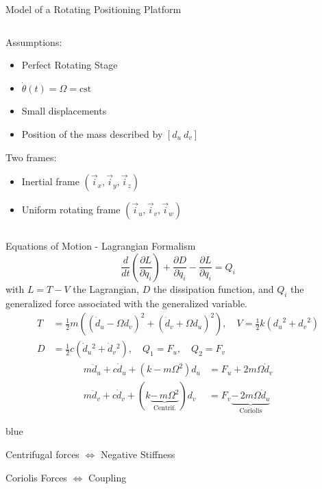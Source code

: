 \documentclass[t, minted]{clean-beamer}
\begin{document}
\begin{frame}[label={sec:orgb466daa}]{Model of a Rotating Positioning Platform}
\begin{columns}
\begin{column}{0.45\columnwidth}
Assumptions:
\begin{itemize}
\item Perfect Rotating Stage
\item \(\dot{\theta}(t) = \Omega = \text{cst}\)
\item Small displacements
\item Position of the mass described by \([d_u\ d_v]\)
\end{itemize}

\vspace{1em}

Two frames:
\begin{itemize}
\item Inertial frame \((\vec{i}_x, \vec{i}_y, \vec{i}_z)\)
\item Uniform rotating frame \((\vec{i}_u, \vec{i}_v, \vec{i}_w)\)
\end{itemize}
\end{column}
\end{columns}
\end{frame}

\begin{frame}[label={sec:orgc029b67}]{Equations of Motion - Lagrangian Formalism}
\vspace{-1em}
\begin{equation*}
  \frac{d}{dt} \left( \frac{\partial L}{\partial \dot{q}_i} \right) + \frac{\partial D}{\partial \dot{q}_i} - \frac{\partial L}{\partial q_i} = Q_i
\end{equation*}
with \(L = T - V\) the Lagrangian, \(D\) the dissipation function, and \(Q_i\) the generalized force associated with the generalized variable.
\begin{align*}
  T &= \frac{1}{2} m \left( \left( \dot{d}_u - \Omega d_v \right)^2 + \left( \dot{d}_v + \Omega d_u \right)^2 \right), \quad V = \frac{1}{2} k \left( {d_u}^2 + {d_v}^2 \right) \\
  D &= \frac{1}{2} c \left( \dot{d}_u{}^2 + \dot{d}_v{}^2 \right), \quad Q_1 = F_u, \quad Q_2 = F_v
\end{align*}
\vspace{-1em}
\begin{align*}
  m \ddot{d}_u + c \dot{d}_u + ( k - m \Omega^2 ) d_u &= F_u + 2 m \Omega \dot{d}_v \\
  m \ddot{d}_v + c \dot{d}_v + ( k \underbrace{-\,m \Omega^2}_{\text{Centrif.}} ) d_v &= F_v \underbrace{-\,2 m \Omega \dot{d}_u}_{\text{Coriolis}}
\end{align*}
\begin{cbox}[]{blue}{}
\begin{center}
Centrifugal forces \(\Longleftrightarrow\) Negative Stiffness

Coriolis Forces \(\Longleftrightarrow\) Coupling
\end{center}
\end{cbox}
\end{frame}
\end{document}
